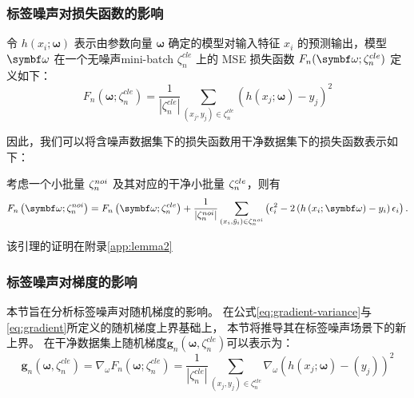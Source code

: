 \subsubsection{标签噪声对损失函数的影响}
令 $h(x_i; \boldsymbol{\omega})$ 表示由参数向量 $\boldsymbol{\omega}$ 确定的模型对输入特征 $x_i$ 的预测输出，模型 $\omegab$ 在一个无噪声mini-batch $\zeta_n^{cle}$ 上的 MSE 损失函数 $F_{n}(\omegab;\zeta_n^{cle})$ 定义如下：
\begin{equation}\label{eq:mse}
F_n\left(\boldsymbol{\omega};\zeta_n^{cle}\right)=\frac{1}{|\zeta_n^{cle}|}\sum_{\left(x_j,y_j\right)\in \zeta_n^{cle}}\left(h\left(x_j;\boldsymbol{\omega}\right)-y_j\right)^2
\end{equation}

\noindent 因此，我们可以将含噪声数据集下的损失函数用干净数据集下的损失函数表示如下：

\begin{lemma}[带标签噪声的MSE]\label{lem:mse}
考虑一个小批量 $\zeta^{noi}_n$ 及其对应的干净小批量 $\zeta^{cle}_n$，则有
\begin{multline}
F_n\left(\omegab;\zetanoi_n\right)=F_n\left(\omegab;\zetacle_n\right)
    +\frac{1}{|\zetanoi_n|}\sum_{\left(x_i,\tilde{y}_i\right)\in \zetanoi_n}\left( \epsilon_i^2 - 2\left(h\left(x_i;\omegab\right)-y_i\right)\epsilon_i \right).
\end{multline}
\end{lemma}
\noindent 该引理的证明在附录\ref{app:lemma2}


\subsubsection{标签噪声对梯度的影响}\label{subsubsec:mse gradient}
本节旨在分析标签噪声对随机梯度的影响。
在公式\eqref{eq:gradient-variance}与\eqref{eq:gradient}所定义的随机梯度上界基础上，
本节将推导其在标签噪声场景下的新上界。
在干净数据集上随机梯度$\boldsymbol{g}_n\left(\boldsymbol{\omega},\zeta_n^{cle}\right)$可以表示为：
\begin{equation}\label{Gradient of clean loss}
\boldsymbol{g}_n\left(\boldsymbol{\omega},\zeta_n^{cle}\right)=\nabla_\omega  F_n\left(\boldsymbol{\omega};\zeta_n^{cle}\right)
=\frac{1}{|\zeta_n^{cle}|}\sum_{\left(x_j,y_j\right)\in \zeta_n^{cle}} \nabla_\omega \left(h\left(x_j;\boldsymbol{\omega}\right)-\left(y_j\right)\right)^2
\end{equation}

